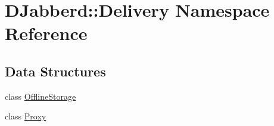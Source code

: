 \hypertarget{namespace_d_jabberd_1_1_delivery}{
\section{\-D\-Jabberd\-:\-:\-Delivery \-Namespace \-Reference}
\label{namespace_d_jabberd_1_1_delivery}
}
\subsection*{\-Data \-Structures}
\begin{DoxyCompactItemize}
\item 
class \hyperlink{class_d_jabberd_1_1_delivery_1_1_offline_storage}{\-Offline\-Storage}
\item 
class \hyperlink{class_d_jabberd_1_1_delivery_1_1_proxy}{\-Proxy}
\end{DoxyCompactItemize}
